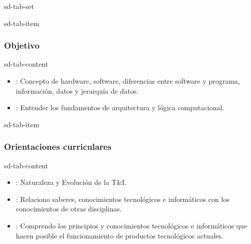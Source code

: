 \documentclass[letterpaper,10pt,spanish]{sphinxmanual}
\begin{document}
\begin{sphinxuseclass}{sd-tab-set}
\begin{sphinxuseclass}{sd-tab-item}\subsubsection*{Objetivo}

\begin{sphinxuseclass}{sd-tab-content}
\sphinxAtStartPar
{}
\begin{itemize}
\item {} 
\sphinxAtStartPar
{}: Concepto de hardware, software, diferencias entre software y programa, información, datos y jerarquía de datos.

\item {} 
\sphinxAtStartPar
{}: Entender los fundamentos de arquitectura y lógica computacional.

\end{itemize}

\end{sphinxuseclass}
\end{sphinxuseclass}
\begin{sphinxuseclass}{sd-tab-item}\subsubsection*{Orientaciones curriculares}

\begin{sphinxuseclass}{sd-tab-content}\begin{itemize}
\item {} 
\sphinxAtStartPar
{}: Naturaleza y Evolución de la T\&I.

\item {} 
\sphinxAtStartPar
{}: Relaciono saberes, conocimientos tecnológicos e informáticos con los conocimientos de otras disciplinas.

\item {} 
\sphinxAtStartPar
{}: Comprendo los principios y conocimientos tecnológicos e informáticos que hacen posible el funcionamiento de productos tecnológicos actuales.


\end{itemize}
\end{sphinxuseclass}
\end{sphinxuseclass}
\end{sphinxuseclass}
\end{document}
